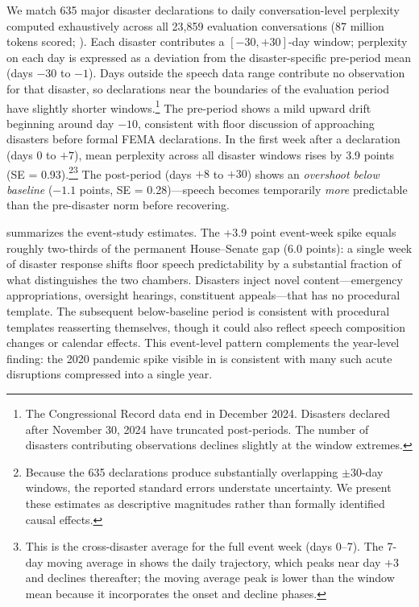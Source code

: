 \documentclass[12pt]{article}
\begin{document}
We match 635 major disaster declarations to daily conversation-level perplexity computed exhaustively across all 23,859 evaluation conversations (87 million tokens scored; ). Each disaster contributes a $[-30, +30]$-day window; perplexity on each day is expressed as a deviation from the disaster-specific pre-period mean (days $-30$ to $-1$). Days outside the speech data range contribute no observation for that disaster, so declarations near the boundaries of the evaluation period have slightly shorter windows.\footnote{The Congressional Record data end in December 2024. Disasters declared after November 30, 2024 have truncated post-periods. The number of disasters contributing observations declines slightly at the window extremes.} The pre-period shows a mild upward drift beginning around day $-10$, consistent with floor discussion of approaching disasters before formal FEMA declarations. In the first week after a declaration (days 0 to $+7$), mean perplexity across all disaster windows rises by 3.9 points (SE = 0.93).\footnote{Because the 635 declarations produce substantially overlapping $\pm30$-day windows, the reported standard errors understate uncertainty. We present these estimates as descriptive magnitudes rather than formally identified causal effects.}\footnote{This is the cross-disaster average for the full event week (days 0--7). The 7-day moving average in  shows the daily trajectory, which peaks near day $+3$ and declines thereafter; the moving average peak is lower than the window mean because it incorporates the onset and decline phases.} The post-period (days $+8$ to $+30$) shows an \textit{overshoot below baseline} ($-1.1$ points, SE = 0.28)---speech becomes temporarily \textit{more} predictable than the pre-disaster norm before recovering.

 summarizes the event-study estimates. The +3.9 point event-week spike equals roughly two-thirds of the permanent House--Senate gap (6.0 points): a single week of disaster response shifts floor speech predictability by a substantial fraction of what distinguishes the two chambers. Disasters inject novel content---emergency appropriations, oversight hearings, constituent appeals---that has no procedural template. The subsequent below-baseline period is consistent with procedural templates reasserting themselves, though it could also reflect speech composition changes or calendar effects. This event-level pattern complements the year-level finding: the 2020 pandemic spike visible in  is consistent with many such acute disruptions compressed into a single year.
\end{document}
